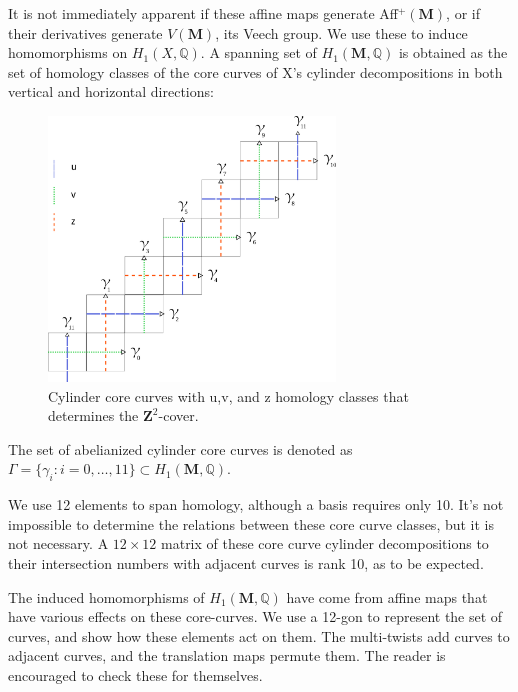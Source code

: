 \documentclass[]{article}
\begin{document}
It is not immediately apparent if these affine maps generate Aff$^{+}(\mathbf{M})$, or if their derivatives generate $V(\mathbf{M})$, its Veech group. We use these to induce homomorphisms on $H_1(X, \mathbb Q)$. A spanning set of $H_1(\mathbf{M}, \mathbb Q)$ is obtained as the set of homology classes of the core curves of X's cylinder decompositions in both vertical and horizontal directions:

\begin{figure}[H]
\includegraphics[width=3in]{homologyclass.png}
\centering
\caption{Cylinder core curves with u,v, and z homology classes that determines the $\mathbf{Z}^{2}$-cover.}
\label{fig:homology}
\end{figure}

\begin{Def}
The set of abelianized cylinder core curves is denoted as $\Gamma=\{\gamma_i: i = 0,\dots,11\}\subset H_1(\mathbf{M},\mathbb{Q})$.
\end{Def}

\begin{rem}
We use 12 elements to span homology, although a basis requires only 10. It's not impossible to determine the relations between these core curve classes, but it is not necessary. A $12\times12$ matrix of these core curve cylinder decompositions to their intersection numbers with adjacent curves is rank 10, as to be expected.
\end{rem}

The induced homomorphisms of $H_1(\mathbf{M}, \mathbb Q)$ have come from affine maps that have various effects on these core-curves. We use a 12-gon to represent the set of curves, and show how these elements act on them. The multi-twists add curves to adjacent curves, and the translation maps permute them. The reader is encouraged to check these for themselves.
\end{document}
